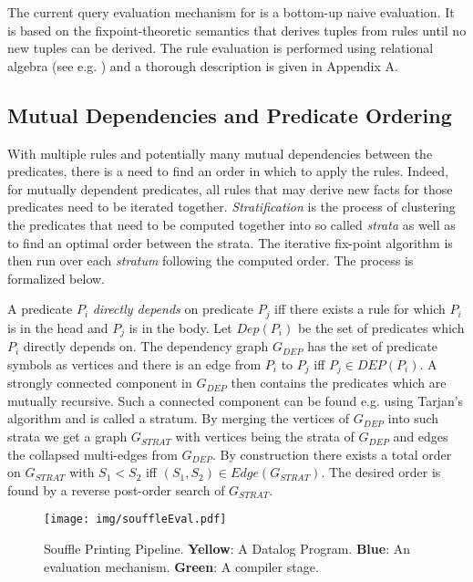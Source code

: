 \newcommand{\sigmatwo}{\overline{\sigma}}
The current query evaluation mechanism for \datalogM is a bottom-up naive\cite{Green:2013:DRQ:2688167.2688168} evaluation. It is based on the fixpoint-theoretic semantics that derives tuples from rules until no new tuples can be derived. The rule evaluation is performed using relational algebra (see e.g. \cite{Abiteboul:1995:FDL:551350}) and a thorough description is given in Appendix A.

\subsection{Mutual Dependencies and Predicate Ordering}
With multiple rules and potentially many mutual dependencies between the predicates, there is a need to find an order in which to apply the rules. Indeed, for mutually dependent predicates, all rules that may derive new facts for those predicates need to be iterated together. \textit{Stratification}\cite{Green:2013:DRQ:2688167.2688168} is the process of clustering the predicates that need to be computed together into so called \textit{strata} as well as to find an optimal order between the strata. The iterative fix-point algorithm is then run over each \textit{stratum} following the computed order. The process is formalized below.

A predicate $P_i$ \textit{directly depends} on predicate $P_j$ iff there exists a rule for which $P_i$ is in the head and $P_j$ is in the body. Let $Dep(P_i)$ be the set of predicates which $P_i$ directly depends on. The dependency graph $G_{DEP}$ has the set of predicate symbols as vertices and there is an edge from $P_i$ to $P_j$ iff $P_j \in DEP(P_i)$. A strongly connected component in $G_{DEP}$ then contains the predicates which are mutually recursive. Such a connected component can be found e.g. using Tarjan's algorithm \cite{Tarjan72depthfirst} and is called a stratum. By merging the vertices of $G_{DEP}$ into such strata we get a graph $G_{STRAT}$ with vertices being the strata of $G_{DEP}$ and edges the collapsed multi-edges from $G_{DEP}$. By construction there exists a total order on $G_{STRAT}$ with $S_1 < S_2$ iff $(S_1, S_2) \in Edge(G_{STRAT})$. The desired order is found by a reverse post-order search of $G_{STRAT}$.
\begin{figure*}[!hbt]
	\texttt{[image: img/souffleEval.pdf]}
	\caption{Souffle Printing Pipeline. \textbf{Yellow}: A Datalog Program. \textbf{Blue}: An evaluation mechanism. \textbf{Green}: A compiler stage. }
	\label{figure:soufflePipeline}
\end{figure*}
